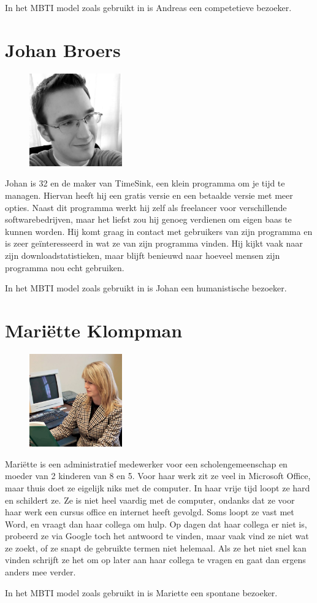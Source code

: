 In het MBTI model zoals gebruikt in \cite{Klompsma} is Andreas een competetieve bezoeker.

\section{Johan Broers}
  \begin{figure}
      \includegraphics[height=40mm]{../images/personas/johan}
  \end{figure}
Johan is 32 en de maker van TimeSink, een klein programma om je tijd te managen. Hiervan heeft hij een gratis versie en een betaalde versie met meer opties. Naast dit programma werkt hij zelf als freelancer voor verschillende softwarebedrijven, maar het liefst zou hij genoeg verdienen om eigen baas te kunnen worden. Hij komt graag in contact met gebruikers van zijn programma en is zeer ge\"interesseerd in wat ze van zijn programma vinden. Hij kijkt vaak naar zijn downloadstatistieken, maar blijft benieuwd naar hoeveel mensen zijn programma nou echt gebruiken.

In het MBTI model zoals gebruikt in \cite{Klompsma} is Johan een humanistische bezoeker.

\section{Mari\"ette Klompman}
  \begin{figure}
      \includegraphics[height=40mm]{../images/personas/mariette}
  \end{figure}
Mari\"ette is een administratief medewerker voor een scholengemeenschap en moeder van 2 kinderen van 8 en 5. Voor haar werk zit ze veel in Microsoft Office, maar thuis doet ze eigelijk niks met de computer. In haar vrije tijd loopt ze hard en schildert ze. Ze is niet heel vaardig met de computer, ondanks dat ze voor haar werk een cursus office en internet heeft gevolgd. Soms loopt ze vast met Word, en vraagt dan haar collega om hulp. Op dagen dat haar collega er niet is, probeerd ze via Google toch het antwoord te vinden, maar vaak vind ze niet wat ze zoekt, of ze snapt de gebruikte termen niet helemaal. Als ze het niet snel kan vinden schrijft ze het om op later aan haar collega te vragen en gaat dan ergens anders mee verder.

In het MBTI model zoals gebruikt in \cite{Klompsma} is Mariette een spontane bezoeker.

